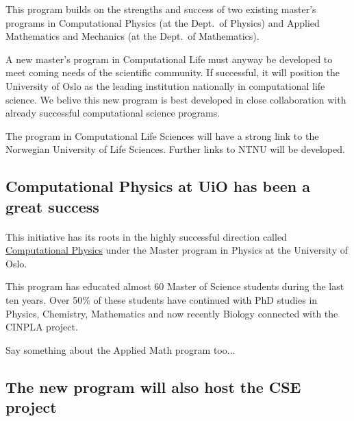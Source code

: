 \documentclass[%
twoside,                 %
final,                   %
10pt]{article}
\begin{document}
This program builds on the strengths and success of two existing master's
programs in Computational Physics (at the Dept.~of Physics) and
Applied Mathematics and Mechanics (at the Dept.~of Mathematics).

A new master's program in Computational Life must anyway be developed to
meet coming needs of the scientific community. If successful, it will
position the University of Oslo as the leading institution
nationally in computational life science. We belive this new program is
best developed in close collaboration with already successful
computational science programs.

The program in Computational Life Sciences will have a strong
link to the Norwegian University of Life Sciences. Further links to
NTNU will be developed.




\subsection*{Computational Physics at UiO has been a great success}

\paragraph{}

This initiative has its roots in the highly successful direction called \href{{http://www.uio.no/english/studies/programmes/physics-master/programme-options/computational/index.html}}{Computational Physics}
under the Master program in Physics at the University of Oslo.

This program has educated almost 60 Master of Science students during
the last ten years.  Over 50\% of these students have continued with
PhD studies in Physics, Chemistry, Mathematics and now recently
Biology connected with the CINPLA project.

Say something about the Applied Math program too...



\subsection*{The new program will also host the CSE project}

\paragraph{}
\end{document}
